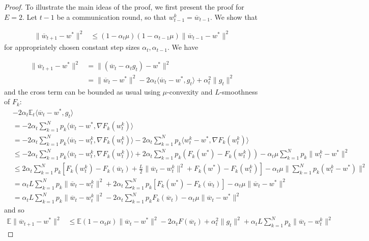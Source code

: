 \begin{proof}
	To illustrate the main ideas of the proof, we first present the proof
	for $E=2$. Let $t-1$ be a communication round, so that $w_{t-1}^{k}=\overline{w}_{t-1}$.
	We show that 
	
	\begin{align*}
	\|\overline{w}_{t+1}-w^{\ast}\|^{2} & \leq(1-\alpha_{t}\mu)(1-\alpha_{t-1}\mu)\|\overline{w}_{t-1}-w^{\ast}\|^{2}
	\end{align*}
	for appropriately chosen constant step sizes $\alpha_{t},\alpha_{t-1}$.
	We have 
	
	\begin{align*}
	\|\overline{w}_{t+1}-w^{\ast}\|^{2} & =\|(\overline{w}_{t}-\alpha_{t}g_{t})-w^{\ast}\|^{2}\\
	& =\|\overline{w}_{t}-w^{\ast}\|^{2}-2\alpha_{t}\langle\overline{w}_{t}-w^{\ast},g_{t}\rangle+\alpha_{t}^{2}\|g_{t}\|^{2}
	\end{align*}
	and the cross term can be bounded as usual using $\mu$-convexity
	and $L$-smoothness of $F_{k}$:
	\begin{align*}
	&-2\alpha_{t}\mathbb{E}_{t}\langle\overline{w}_{t}-w^{\ast},g_{t}\rangle\\
	& =-2\alpha_{t}\sum_{k=1}^{N}p_{k}\langle\overline{w}_{t}-w^{\ast},\nabla F_{k}(w_{t}^{k})\rangle\\
	& =-2\alpha_{t}\sum_{k=1}^{N}p_{k}\langle\overline{w}_{t}-w_{t}^{k},\nabla F_{k}(w_{t}^{k})\rangle-2\alpha_{t}\sum_{k=1}^{N}p_{k}\langle w_{t}^{k}-w^{\ast},\nabla F_{k}(w_{t}^{k})\rangle\\
	& \leq-2\alpha_{t}\sum_{k=1}^{N}p_{k}\langle\overline{w}_{t}-w_{t}^{k},\nabla F_{k}(w_{t}^{k})\rangle+2\alpha_{t}\sum_{k=1}^{N}p_{k}(F_{k}(w^{\ast})-F_{k}(w_{t}^{k}))-\alpha_{t}\mu\sum_{k=1}^{N}p_{k}\|w_{t}^{k}-w^{\ast}\|^{2}\\
	& \leq2\alpha_{t}\sum_{k=1}^{N}p_{k}\left[F_{k}(w_{t}^{k})-F_{k}(\overline{w}_{t})+\frac{L}{2}\|\overline{w}_{t}-w_{t}^{k}\|^{2}+F_{k}(w^{\ast})-F_{k}(w_{t}^{k})\right]-\alpha_{t}\mu\|\sum_{k=1}^{N}p_{k}(w_{t}^{k}-w^{\ast})\|^{2}\\
	& =\alpha_{t}L\sum_{k=1}^{N}p_{k}\|\overline{w}_{t}-w_{t}^{k}\|^{2}+2\alpha_{t}\sum_{k=1}^{N}p_{k}\left[F_{k}(w^{\ast})-F_{k}(\overline{w}_{t})\right]-\alpha_{t}\mu\|\overline{w}_{t}-w^{\ast}\|^{2}\\
	& =\alpha_{t}L\sum_{k=1}^{N}p_{k}\|\overline{w}_{t}-w_{t}^{k}\|^{2}-2\alpha_{t}\sum_{k=1}^{N}p_{k}F_{k}(\overline{w}_{t})-\alpha_{t}\mu\|\overline{w}_{t}-w^{\ast}\|^{2}
	\end{align*}
	and so 
	\begin{align*}
	\mathbb{E}\|\overline{w}_{t+1}-w^{\ast}\|^{2} & \leq\mathbb{E}(1-\alpha_{t}\mu)\|\overline{w}_{t}-w^{\ast}\|^{2}-2\alpha_{t}F(\overline{w}_{t})+\alpha_{t}^{2}\|g_{t}\|^{2}+\alpha_{t}L\sum_{k=1}^{N}p_{k}\|\overline{w}_{t}-w_{t}^{k}\|^{2}
	\end{align*}
	

\end{proof}
